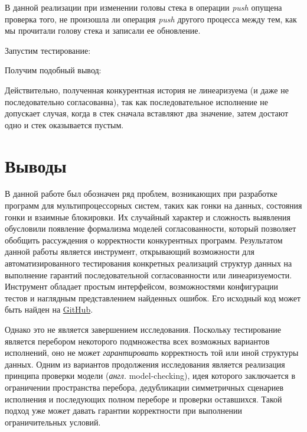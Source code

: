 \documentclass[14pt, openany]{book}
\begin{document}
В данной реализации при изменении головы стека в операции \textit{push} опущена проверка того, не произошла ли операция \textit{push}  другого процесса между тем, как мы прочитали голову стека и записали ее обновление.

Запустим тестирование:


Получим подобный вывод:


Действительно, полученная конкурентная история не линеаризуема (и даже не последовательно согласованна), так как последовательное исполнение не допускает случая, когда в стек сначала вставляют два значение, затем достают одно и стек оказывается пустым.
 
\chapter{Выводы}
В данной работе был обозначен ряд проблем, возникающих при разработке программ для мультипроцессорных систем, таких как гонки на данных, состояния гонки и взаимные блокировки. Их случайный характер и сложность выявления обусловили появление формализма моделей согласованности, который позволяет обобщить рассуждения о корректности конкурентных программ. Результатом данной работы является инструмент, открывающий возможности для автоматизированного тестирования конкретных реализаций структур данных на выполнение гарантий последовательной согласованности или линеаризуемости. Инструмент обладает простым интерфейсом, возможностями конфигурации тестов и наглядным представлением найденных ошибок. Его исходный код может быть найден на \href{https://github.com/susliko/lotos}{GitHub}. \par
Однако это не является завершением исследования. Поскольку тестирование является перебором некоторого подмножества всех возможных вариантов исполнений, оно не может \textit{гарантировать} корректность той или иной структуры данных. Одним из вариантов продолжения исследования является реализация принципа проверки модели (\textit{англ.} model-checking), идея которого заключается в ограничении пространства перебора, дедубликации симметричных сценариев исполнения и последующих полном переборе и проверки оставшихся. Такой подход уже может давать гарантии корректности при выполнении ограничительных условий.


\end{document}
